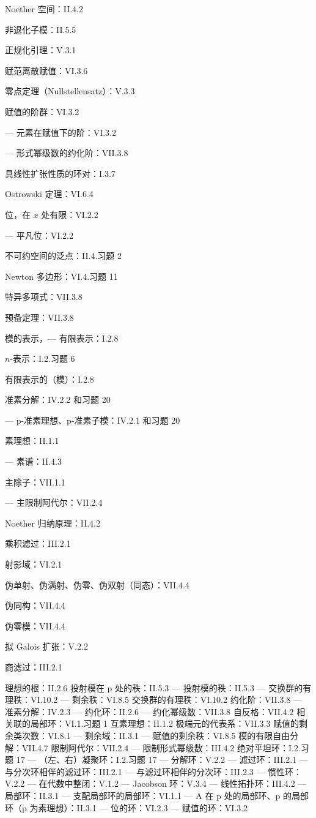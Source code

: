 Noether 空间：II.4.2

非退化子模：II.5.5

正规化引理：V.3.1

赋范离散赋值：VI.3.6

零点定理（Nullstellensatz）：V.3.3

赋值的阶群：VI.3.2

--- 元素在赋值下的阶：VI.3.2

--- 形式幂级数的约化阶：VII.3.8

具线性扩张性质的环对：I.3.7

Ostrowski 定理：VI.6.4

位，在 \(x\) 处有限：VI.2.2

--- 平凡位：VI.2.2

不可约空间的泛点：II.4.习题 2

Newton 多边形：VI.4.习题 11

特异多项式：VII.3.8

预备定理：VII.3.8

模的表示，--- 有限表示：I.2.8

\(n\)-表示：I.2.习题 6

有限表示的（模）：I.2.8

准素分解：IV.2.2 和习题 20

--- p-准素理想、p-准素子模：IV.2.1 和习题 20

素理想：II.1.1

--- 素谱：II.4.3

主除子：VII.1.1

--- 主限制阿代尔：VII.2.4

Noether 归纳原理：II.4.2

乘积滤过：III.2.1

射影域：VI.2.1

伪单射、伪满射、伪零、伪双射（同态）：VII.4.4

伪同构：VII.4.4

伪零模：VII.4.4

拟 Galois 扩张：V.2.2

商滤过：III.2.1

理想的根：II.2.6 投射模在 p 处的秩：II.5.3 --- 投射模的秩：II.5.3 --- 交换群的有理秩：VI.10.2 --- 剩余秩：VI.8.5 交换群的有理秩：VI.10.2 约化阶：VII.3.8 --- 准素分解：IV.2.3 --- 约化环：II.2.6 --- 约化幂级数：VII.3.8 自反格：VII.4.2 相关联的局部环：VI.1.习题 1 互素理想：II.1.2 极端元的代表系：VII.3.3 赋值的剩余类次数：VI.8.1 --- 剩余域：II.3.1 --- 赋值的剩余秩：VI.8.5 模的有限自由分解：VII.4.7 限制阿代尔：VII.2.4 --- 限制形式幂级数：III.4.2 绝对平坦环：I.2.习题 17 --- （左、右）凝聚环：I.2.习题 17 --- 分解环：V.2.2 --- 滤过环：III.2.1 --- 与分次环相伴的滤过环：III.2.1 --- 与滤过环相伴的分次环：III.2.3 --- 惯性环：V.2.2 --- 在代数中整闭：V.1.2 --- Jacobson 环：V.3.4 --- 线性拓扑环：III.4.2 --- 局部环：II.3.1 --- 支配局部环的局部环：VI.1.1 --- A 在 p 处的局部环、p 的局部环（p 为素理想）：II.3.1 --- 位的环：VI.2.3 --- 赋值的环：VI.3.2

